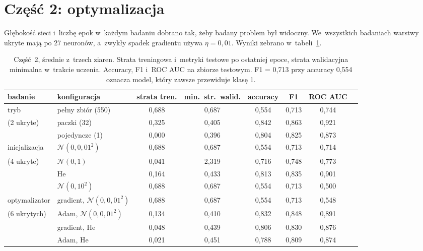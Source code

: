 \documentclass[11pt,a4paper]{article}
\begin{document}
\section{Część 2: optymalizacja}
Głębokość sieci i~liczbę epok w~każdym badaniu dobrano tak, żeby badany problem był widoczny.
We~wszystkich badaniach warstwy ukryte mają po 27 neuronów, a~zwykły spadek gradientu używa
$\eta = 0{,}01$. Wyniki zebrano w~tabeli~\ref{tab:p2}.

\begin{table}[H]
\centering
\small
\begin{tabular}{llcccccc}
\toprule
badanie & konfiguracja & strata tren. & min.\ str.\ walid. & accuracy & F1 & ROC AUC \\
\midrule
tryb       & pełny zbiór (550) & 0,688 & 0,687 & 0,554 & 0,713 & 0,744 \\
(2 ukryte) & paczki (32)       & 0,325 & 0,405 & 0,842 & 0,863 & 0,921 \\
           & pojedyncze (1)    & 0,000 & 0,396 & 0,804 & 0,825 & 0,873 \\
\midrule
inicjalizacja & $\mathcal{N}(0, 0{,}01^2)$ & 0,688 & 0,687 & 0,554 & 0,713 & 0,714 \\
(4 ukryte)    & $\mathcal{N}(0, 1)$        & 0,041 & 2,319 & 0,716 & 0,748 & 0,773 \\
              & He                         & 0,164 & 0,433 & 0,813 & 0,835 & 0,901 \\
              & $\mathcal{N}(0, 10^2)$     & 0,688 & 0,687 & 0,554 & 0,713 & 0,500 \\
\midrule
optymalizator & gradient, $\mathcal{N}(0, 0{,}01^2)$ & 0,688 & 0,687 & 0,554 & 0,713 & 0,548 \\
(6 ukrytych)  & Adam, $\mathcal{N}(0, 0{,}01^2)$     & 0,134 & 0,410 & 0,832 & 0,848 & 0,891 \\
              & gradient, He                         & 0,048 & 0,439 & 0,806 & 0,830 & 0,876 \\
              & Adam, He                             & 0,021 & 0,451 & 0,788 & 0,809 & 0,874 \\
\bottomrule
\end{tabular}
\caption{Część~2, średnie z~trzech ziaren. Strata treningowa i~metryki testowe po ostatniej
epoce, strata walidacyjna minimalna w~trakcie uczenia. Accuracy, F1 i~ROC AUC na zbiorze
testowym. F1 = 0,713 przy accuracy 0,554 oznacza model, który zawsze przewiduje klasę 1.}
\label{tab:p2}
\end{table}
\end{document}
